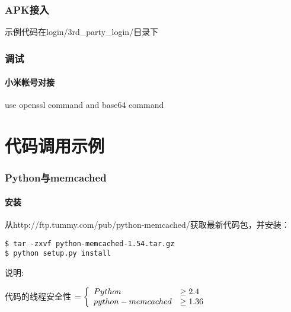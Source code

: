 \documentclass{beamer}
\begin{document}
\begin{frame}
\frametitle{APK接入}

示例代码在login/3rd\_party\_login/目录下

\end{frame}

\begin{frame}
\frametitle{调试}
  \framesubtitle{小米帐号对接}
  use openssl command and base64 command

\end{frame}

\section{代码调用示例}
\begin{frame}[fragile]
\frametitle{Python与memcached}
  \framesubtitle{安装}

从http://ftp.tummy.com/pub/python-memcached/获取最新代码包，并安装：

\begin{lstlisting}[backgroundcolor=\color{light-gray}]
$ tar -zxvf python-memcached-1.54.tar.gz
$ python setup.py install
\end{lstlisting}

\vspace{0.3cm}

{\Large{说明:}}

代码的线程安全性 $ = \left\{ \begin{array}{l l}
                Python  & \ge 2.4  \\
                python-memcached & \ge 1.36 
               \end{array} \right.
$

\end{frame}
\end{document}
